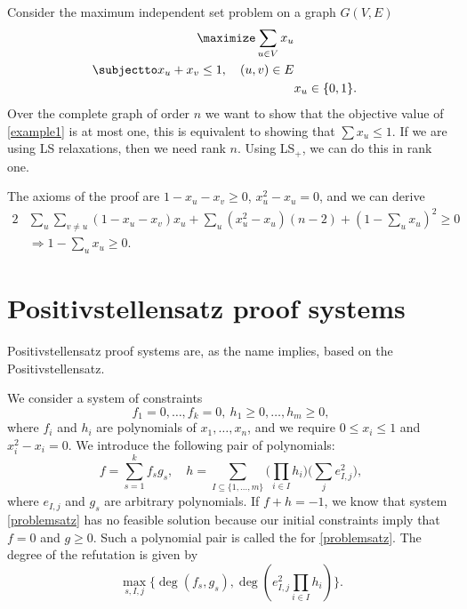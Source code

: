 \documentclass[a4paper,twoside,justified]{tufte-handout}
\begin{document}
\begin{example}
Consider the maximum independent set problem on a graph $G(V,E)$
\begin{alignat}{2}
\label{example1}
  \maximize \sum_{u\in V} x_u\notag \\
  \subjectto x_u+x_v\leq 1,\quad (u,v)\in E\notag\\
&x_u\in\{0,1\}.
\end{alignat}
Over the complete graph of order $n$ we want to show that the objective value of \eqref{example1} is at most one, this is equivalent to showing that $\sum x_u\leq 1$. 
If we are using LS relaxations, then we need rank $n$.
Using LS$_+$, we can do this in rank one.

The axioms of the proof are $1-x_u-x_v\geq 0$, $x_u^2-x_u=0$, and we can derive
\begin{alignat*}{2}
&\sum_u\sum_{v\neq u}(1-x_u-x_v)x_u+\sum_u(x_u^2-x_u)(n-2)+(1-\sum_ux_u)^2\geq0\\
&\Rightarrow1-\sum_ux_u\geq0.
\end{alignat*}
\end{example}

\section{Positivstellensatz proof systems\cite{grigoriev2001complexity}}
Positivstellensatz proof systems are, as the name implies, based on the Positivstellensatz\cite{bochnak1987satz}. 

We consider a system of constraints
\begin{equation}
\label{problemsatz}
f_1=0,\ldots,f_k=0,\ h_1\geq0,\ldots,h_m\geq0,
\end{equation}
where $f_i$ and $h_i$ are polynomials of $x_1,\ldots,x_n$, and we require $0\leq x_i \leq 1$ and $x_i^2-x_i=0$. We introduce the following pair of polynomials:
\begin{equation}
\label{polpair}
f = \sum_{s=1}^kf_sg_s,\quad h = \sum_{I\subseteq\{1,\ldots,m\}}\big(\prod_{i\in I}h_i\big)\big(\sum_je^2_{I,j}\big),
\end{equation}
where $e_{I,j}$ and $g_s$ are arbitrary polynomials. If $f+h=-1$, we know that system \eqref{problemsatz} has no feasible solution because our initial constraints imply that $f=0$ and $g \geq 0$. Such a polynomial pair is called the  for \eqref{problemsatz}. The degree of the refutation is given by
\begin{equation}
\label{degreesatz}
\max_{s,I,j}\{\deg(f_s,g_s),\deg(e^2_{I,j}\prod_{i\in I}h_i)\}.
\end{equation} 
\end{document}
